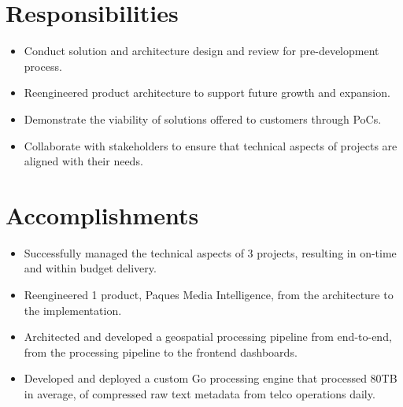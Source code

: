 \documentclass[12pt]{res} %
\begin{document}
\begin{resume}

\begin{multicols}{2}
	\section{Responsibilities}
	\vspace{10pt}
		\begin{itemize}
			\item Conduct solution and architecture design and review for pre-development process.
			\item Reengineered product architecture to support future growth and expansion.
			\item Demonstrate the viability of solutions offered to customers through PoCs.
			\item Collaborate with stakeholders to ensure that technical aspects of projects are aligned with their needs.
		\end{itemize}
	\section{Accomplishments}
	\vspace{10pt}
		\begin{itemize}
			\item Successfully managed the technical aspects of 3 projects, resulting in on-time and within budget delivery.
			\item Reengineered 1 product, Paques Media Intelligence, from the architecture to the implementation.
			\item Architected and developed a geospatial processing pipeline from end-to-end, from the processing pipeline to the frontend dashboards.
			\item Developed and deployed a custom Go processing engine that processed 80TB in average, of compressed raw text metadata from telco operations daily.
		\end{itemize}
\end{multicols}


\end{resume}
\end{document}
